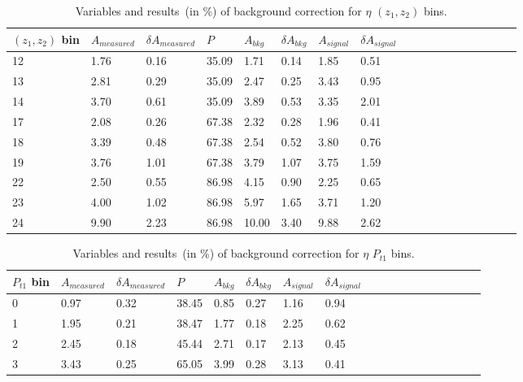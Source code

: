 \begin{table}[H]\footnotesize
\centering
\begin{tabular}{|l|l|l|l|l|l|l|l|l|l|l|l|l|l|l|l|l|l|}
\\ \hline
$(z_1,z_2)$ bin & $A_{measured}$ & $\delta A_{measured}$ & $P$ & $A_{bkg}$ & $\delta A_{bkg}$ & $A_{signal}$ & $\delta A_{signal}$ \\ \hline
12 & 1.76 & 0.16 & 35.09 & 1.71 & 0.14 & 1.85  & 0.51 \\ \hline 
13 & 2.81 & 0.29 & 35.09 & 2.47 & 0.25 & 3.43  & 0.95 \\ \hline 
14 & 3.70 & 0.61 & 35.09 & 3.89 & 0.53 & 3.35  & 2.01 \\ \hline 
17 & 2.08 & 0.26 & 67.38 & 2.32 & 0.28 & 1.96  & 0.41 \\ \hline 
18 & 3.39 & 0.48 & 67.38 & 2.54 & 0.52 & 3.80  & 0.76 \\ \hline 
19 & 3.76 & 1.01 & 67.38 & 3.79 & 1.07 & 3.75  & 1.59 \\ \hline 
22 & 2.50 & 0.55 & 86.98 & 4.15 & 0.90 & 2.25  & 0.65 \\ \hline 
23 & 4.00 & 1.02 & 86.98 & 5.97 & 1.65 & 3.71  & 1.20 \\ \hline 
24 & 9.90 & 2.23 & 86.98 & 10.00 & 3.40 & 9.88  & 2.62 \\ \hline
\end{tabular}
\caption{Variables and results~(in $\%$) of background correction for $\eta$ $(z_1,z_2)$ bins. }
\label{tab:etacomzbkgcor}
\end{table} 

\begin{table}[H]\footnotesize
\centering
\begin{tabular}{|l|l|l|l|l|l|l|l|l|l|l|l|l|l|l|l|l|l|}
\\ \hline
$P_{t1}$ bin & $A_{measured}$ & $\delta A_{measured}$ & $P$  & $A_{bkg}$ & $\delta A_{bkg}$ & $A_{signal}$ & $\delta A_{signal}$ \\ \hline
0 & 0.97 & 0.32 & 38.45 & 0.85 & 0.27 & 1.16  & 0.94 \\ \hline 
1 & 1.95 & 0.21 & 38.47 & 1.77 & 0.18 & 2.25  & 0.62 \\ \hline 
2 & 2.45 & 0.18 & 45.44 & 2.71 & 0.17 & 2.13  & 0.45 \\ \hline 
3 & 3.43 & 0.25 & 65.05 & 3.99 & 0.28 & 3.13  & 0.41 \\ \hline 
\end{tabular}
\caption{Variables and results~(in $\%$) of background correction for $\eta$ $P_{t1}$ bins. }
\label{tab:etasinptbkgcor}
\end{table}

